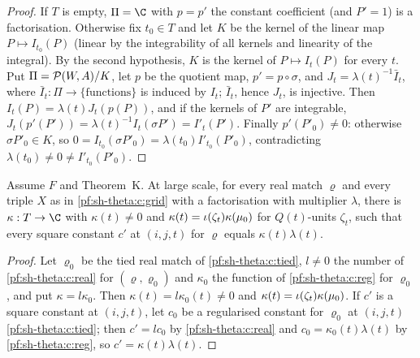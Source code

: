\begin{proof}
If $T$ is empty, $\Pi=\C$ with $p=p'$ the constant coefficient (and $P'=1$) is a factorisation. Otherwise fix $t_0\in T$ and let $K$
be the kernel of the linear map $P\mapsto I_{t_0}(P)$ (linear by the integrability of all kernels and linearity of the integral). By
the second hypothesis, $K$ is the kernel of $P\mapsto I_t(P)$ for every $t$. Put $\Pi=\mathcal{P}(W,A)/K$, let $p$ be the quotient
map, $p'=p\circ\sigma$, and $J_t=\lambda(t)^{-1}\bar I_t$, where $\bar I_t:\Pi\to\{\text{functions}\}$ is induced by $I_t$; $\bar
I_t$, hence $J_t$, is injective. Then $I_t(P)=\lambda(t)J_t(p(P))$, and if the kernels of $P'$ are integrable,
$J_t(p'(P'))=\lambda(t)^{-1}I_t(\sigma P')=I'_t(P')$. Finally $p'(P'_0)\ne0$: otherwise $\sigma P'_0\in K$, so
$0=I_{t_0}(\sigma P'_0)=\lambda(t_0)I'_{t_0}(P'_0)$, contradicting $\lambda(t_0)\ne0\ne I'_{t_0}(P'_0)$.
\end{proof}

\begin{lemma}\label{pf:sh-theta:compare}
Assume $F$ and Theorem~K. At large scale, for every real match $\varrho$ and every triple $X$ as in \ref{pf:sh-theta:c:grid} with a
factorisation with multiplier $\lambda$, there is $\kappa:T\to\C$ with $\kappa(t)\ne0$ and $\kappa(t)=\iota(\zeta_t)\kappa(\mu_0)$
for $Q(t)$-units $\zeta_t$, such that every square constant $c'$ at $(i,j,t)$ for $\varrho$ equals $\kappa(t)\lambda(t)$.
\end{lemma}

\begin{proof}
Let $\varrho_0$ be the tied real match of \ref{pf:sh-theta:c:tied}, $l\ne0$ the number of \ref{pf:sh-theta:c:real} for
$(\varrho,\varrho_0)$ and $\kappa_0$ the function of \ref{pf:sh-theta:c:reg} for $\varrho_0$, and put $\kappa=l\kappa_0$. Then
$\kappa(t)=l\kappa_0(t)\ne0$ and $\kappa(t)=\iota(\zeta_t)\kappa(\mu_0)$. If $c'$ is a square constant at $(i,j,t)$, let $c_0$ be a
regularised constant for $\varrho_0$ at $(i,j,t)$ \ref{pf:sh-theta:c:tied}; then $c'=lc_0$ by \ref{pf:sh-theta:c:real} and
$c_0=\kappa_0(t)\lambda(t)$ by \ref{pf:sh-theta:c:reg}, so $c'=\kappa(t)\lambda(t)$.
\end{proof}

